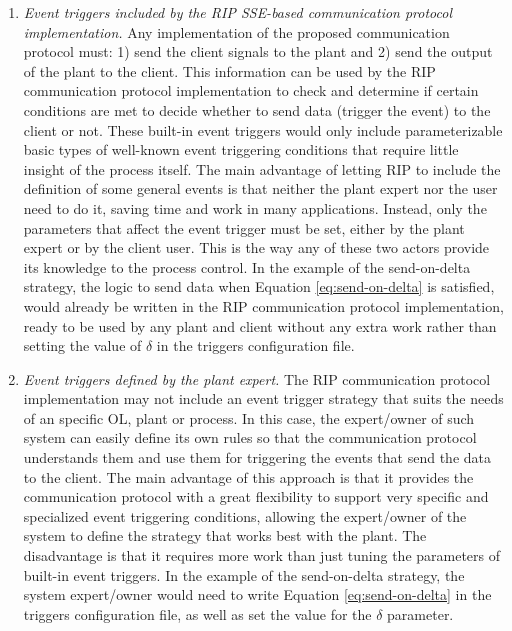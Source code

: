 \begin{enumerate}
	\item \textit{Event triggers included by the RIP SSE-based communication protocol implementation.} Any implementation of the proposed communication protocol must: 1) send the client signals to the plant and 2) send the output of the plant to the client. This information can be used by the RIP communication protocol implementation to check and determine if certain conditions are met to decide whether to send data (trigger the event) to the client or not. These built-in event triggers would only include parameterizable basic types of well-known event triggering conditions that require little insight of the process itself. The main advantage of letting RIP to include the definition of some general events is that neither the plant expert nor the user need to do it, saving time and work in many applications. Instead, only the parameters that affect the event trigger must be set, either by the plant expert or by the client user. This is the way any of these two actors provide its knowledge to the process control. In the example of the send-on-delta strategy, the logic to send data when Equation \ref{eq:send-on-delta} is satisfied, would already be written in the RIP communication protocol implementation, ready to be used by any plant and client without any extra work rather than setting the value of $\delta$ in the triggers configuration file.
	\item \textit{Event triggers defined by the plant expert.} The RIP communication protocol implementation may not include an event trigger strategy that suits the needs of an specific OL, plant or process. In this case, the expert/owner of such system can easily define its own rules so that the communication protocol understands them and use them for triggering the events that send the data to the client. The main advantage of this approach is that it provides the communication protocol with a great flexibility to support very specific and specialized event triggering conditions, allowing the expert/owner of the system to define the strategy that works best with the plant. The disadvantage is that it requires more work than just tuning the parameters of built-in event triggers. In the example of the send-on-delta strategy, the system expert/owner would need to write Equation \ref{eq:send-on-delta} in the triggers configuration file, as well as set the value for the $\delta$ parameter.

\end{enumerate}
